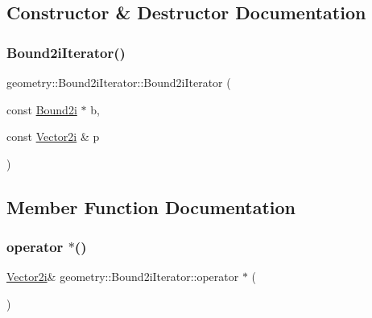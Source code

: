 \subsection{Constructor \& Destructor Documentation}
\mbox{\label{classgeometry_1_1Bound2iIterator_adcaf8210b4c30af0f2345a71e320cfab}} 
\subsubsection{\texorpdfstring{Bound2iIterator()}{Bound2iIterator()}}
{\footnotesize\ttfamily geometry\+::\+Bound2i\+Iterator\+::\+Bound2i\+Iterator (\begin{DoxyParamCaption}\item[{const \mbox{\hyperlink{namespacegeometry_a918a919c0a947983a121b11e5c64934f}{Bound2i}} $\ast$}]{b,  }\item[{const \mbox{\hyperlink{cyclop_8hpp_ac9c6c66d543f1c0c5bc66579727dae30}{Vector2i}} \&}]{p }\end{DoxyParamCaption})\hspace{0.3cm}{\ttfamily [inline]}}



\subsection{Member Function Documentation}
\mbox{\label{classgeometry_1_1Bound2iIterator_ac6dc53448f0595fa1269bf47c3a96b19}} 
\subsubsection{\texorpdfstring{operator $\ast$()}{operator *()}}
{\footnotesize\ttfamily \mbox{\hyperlink{cyclop_8hpp_ac9c6c66d543f1c0c5bc66579727dae30}{Vector2i}}\& geometry\+::\+Bound2i\+Iterator\+::operator $\ast$ (\begin{DoxyParamCaption}{ }\end{DoxyParamCaption})\hspace{0.3cm}{\ttfamily [inline]}}

